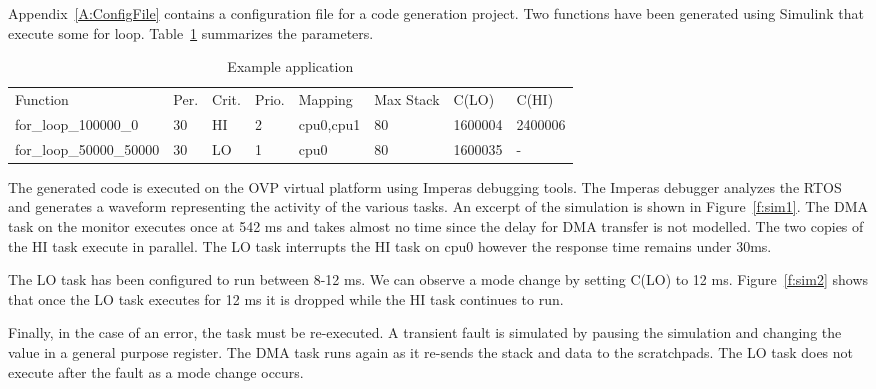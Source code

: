 	Appendix~\ref{A:ConfigFile} contains a configuration file for a code generation project. 
	Two functions have been generated using Simulink that execute some for loop. Table~\ref{t:config} summarizes the parameters.
	
	
	

\begin{table}[h]
\caption{Example application}
\centering

	\begin{tabular}{@{}llllllll@{}}
	\toprule
	Function & Per. & Crit. & Prio. & Mapping & Max Stack & C(LO) & C(HI) 	 \\
	for\_loop\_100000\_0 & 30 & HI & 2 & cpu0,cpu1 & 80 & 1600004 & 2400006 \\
	for\_loop\_50000\_50000 & 30 & LO & 1 & cpu0 & 80 & 1600035 & - \\
	\end{tabular}

\label{t:config}
\end{table}
	

	The generated code is executed on the OVP virtual platform using Imperas debugging tools. The Imperas debugger analyzes the RTOS and generates a waveform representing the activity of the various tasks. 
	An excerpt of the simulation is shown in Figure~\ref{f:sim1}.
	The DMA task on the monitor executes once at 542 ms and takes almost no time since the delay for DMA transfer is not modelled.
	The two copies of the HI task execute in parallel. The LO task interrupts the HI task on cpu0 however the response time remains under 30ms.
	
	The LO task has been configured to run between 8-12 ms. We can observe a mode change by setting C(LO) to 12 ms. 
	Figure~\ref{f:sim2} shows that once the LO task executes for 12 ms it is dropped while the HI task continues to run.
	 
		
	Finally, in the case of an error, the task must be re-executed. 
	A transient fault is simulated by pausing the simulation and changing the value in a general purpose register. 
	The DMA task runs again as it re-sends the stack and data to the scratchpads.
	The LO task does not execute after the fault as a mode change occurs.
	
		 
		
